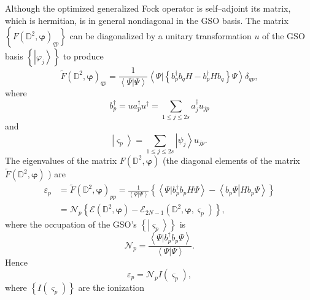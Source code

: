 \documentclass[aps,preprint]{revtex4}%
\begin{document}
Although the optimized generalized Fock operator is self--adjoint its matrix,
which is hermitian, is in general nondiagonal in the GSO basis. The matrix
$\left\{  F\left(  \mathbb{D}^{2},\mathbf{\varphi}\right)  _{qp}\right\}  $
can be diagonalized by a unitary transformation $u$ of the GSO basis $\left\{
\left\vert \varphi_{j}\right\rangle \right\}  $ to produce
\begin{equation}
\tilde{F}\left(  \mathbb{D}^{2},\mathbf{\varphi}\right)  _{qp}=\frac
{1}{\left\langle \left.  \Psi\right\vert \Psi\right\rangle }\left\langle
\left.  \Psi\right\vert \left\{  b_{p}^{\dagger}b_{q}H-b_{p}^{\dagger}%
Hb_{q}\right\}  \Psi\right\rangle \delta_{qp},
\end{equation}
where
\begin{equation}
b_{p}^{\dagger}=ua_{p}^{\dagger}u^{\dagger}=\sum_{1\leq j\leq2s}a_{j}%
^{\dagger}u_{jp}%
\end{equation}
and
\begin{equation}
\left\vert \varsigma_{p}\right\rangle =\sum_{1\leq j\leq2s}\left\vert \psi
_{j}\right\rangle u_{jp}.
\end{equation}
The eigenvalues of the matrix $F\left(  \mathbb{D}^{2},\mathbf{\varphi
}\right)  $ (the diagonal elements of the matrix $\tilde{F}\left(
\mathbb{D}^{2},\mathbf{\varphi}\right)  $ ) are
\begin{align}
\varepsilon_{p}  &  =\tilde{F}\left(  \mathbb{D}^{2},\mathbf{\varphi}\right)
_{pp}=\frac{1}{\left\langle \left.  \Psi\right\vert \Psi\right\rangle
}\left\{  \left\langle \left.  \Psi\right\vert b_{p}^{\dagger}b_{p}%
H\Psi\right\rangle -\left\langle \left.  b_{p}\Psi\right\vert Hb_{p}%
\Psi\right\rangle \right\} \nonumber\\
&  =\mathcal{N}_{p}\left\{  \mathcal{E}\left(  \mathbb{D}^{2},\mathbf{\varphi
}\right)  -\mathcal{E}_{2N-1}\left(  \mathbb{D}^{2},\mathbf{\varphi,}%
\varsigma_{p}\right)  \right\}  ,
\end{align}
where the occupation of the GSO's $\left\{  \left\vert \varsigma
_{p}\right\rangle \right\}  $ is
\begin{equation}
\mathcal{N}_{p}=\frac{\left\langle \left.  \Psi\right\vert b_{p}^{\dagger
}b_{p}\Psi\right\rangle }{\left\langle \left.  \Psi\right\vert \Psi
\right\rangle }.
\end{equation}
Hence
\begin{equation}
\varepsilon_{p}=\mathcal{N}_{p}I\left(  \varsigma_{p}\right)  ,
\end{equation}
where $\left\{  I\left(  \varsigma_{p}\right)  \right\}  $ are the ionization
\end{document}
